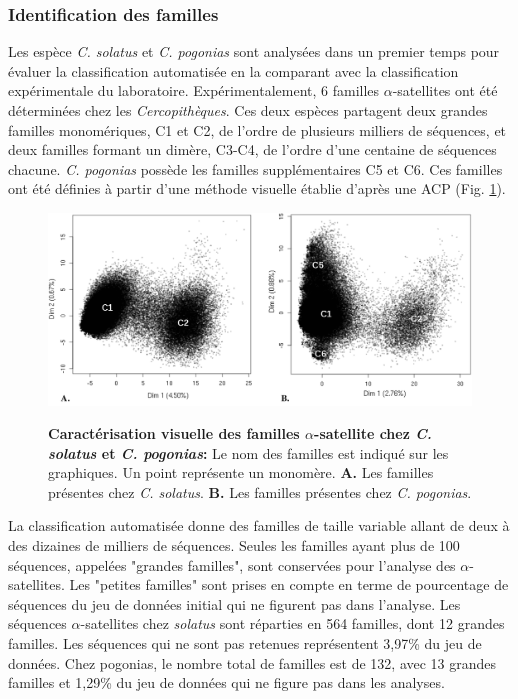 \documentclass[12pt,a4paper]{article}
\begin{document}
			\subsubsection{Identification des familles}
			Les espèce \textit{C. solatus} et \textit{C. pogonias} sont analysées dans un premier temps pour évaluer la classification automatisée en la comparant avec la classification expérimentale du laboratoire. Expérimentalement, 6 familles $\alpha$-satellites ont été déterminées chez les \textit{Cercopithèques}. Ces deux espèces partagent deux grandes familles monomériques, C1 et C2, de l'ordre de plusieurs milliers de séquences, et deux familles formant un dimère, C3-C4, de l'ordre d'une centaine de séquences chacune. \textit{C. pogonias} possède les familles supplémentaires C5 et C6. Ces familles ont été définies à partir d'une méthode visuelle établie d'après une ACP (Fig. \ref{fig:ACP_exp}).\\
	\begin{figure}	
		\includegraphics[scale=0.4]{img/ACP_experimental.png}  \\
		\caption{\textbf{Caractérisation visuelle des familles $\alpha$-satellite chez \textit{C. solatus} et \textit{C. pogonias}:}\label{fig:ACP_exp}
		Le nom des familles est indiqué sur les graphiques. Un point représente un monomère. \textbf{A.} Les familles présentes chez \textit{C. solatus}. \textbf{B.} Les familles présentes chez \textit{C. pogonias}.} 
	\end{figure}
	
			La classification automatisée donne des familles de taille variable allant de deux  à des dizaines de milliers de séquences. Seules les familles ayant plus de 100 séquences, appelées "grandes familles", sont conservées pour l'analyse des $\alpha$-satellites. Les "petites familles" sont prises en compte en terme de pourcentage de séquences du jeu de données initial qui ne figurent pas dans l'analyse. Les séquences $\alpha$-satellites chez \textit{solatus} sont réparties en 564 familles, dont 12 grandes familles. Les séquences qui ne sont pas retenues représentent 3,97\% du jeu de données. Chez pogonias, le nombre total de familles est de 132, avec 13 grandes familles et 1,29\% du jeu de données qui  ne figure pas dans les analyses.\\
			
\end{document}
